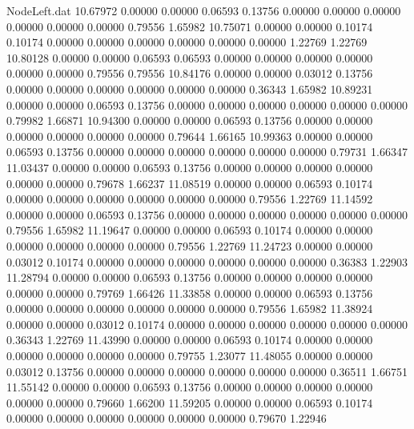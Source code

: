 \begin{filecontents}{NodeLeft.dat}
  10.67972    0.00000    0.00000     0.06593    0.13756    0.00000    0.00000    0.00000    0.00000    0.00000    0.00000    0.79556    1.65982
  10.75071    0.00000    0.00000     0.10174    0.10174    0.00000    0.00000    0.00000    0.00000    0.00000    0.00000    1.22769    1.22769
  10.80128    0.00000    0.00000     0.06593    0.06593    0.00000    0.00000    0.00000    0.00000    0.00000    0.00000    0.79556    0.79556
  10.84176    0.00000    0.00000     0.03012    0.13756    0.00000    0.00000    0.00000    0.00000    0.00000    0.00000    0.36343    1.65982
  10.89231    0.00000    0.00000     0.06593    0.13756    0.00000    0.00000    0.00000    0.00000    0.00000    0.00000    0.79982    1.66871
  10.94300    0.00000    0.00000     0.06593    0.13756    0.00000    0.00000    0.00000    0.00000    0.00000    0.00000    0.79644    1.66165
  10.99363    0.00000    0.00000     0.06593    0.13756    0.00000    0.00000    0.00000    0.00000    0.00000    0.00000    0.79731    1.66347
  11.03437    0.00000    0.00000     0.06593    0.13756    0.00000    0.00000    0.00000    0.00000    0.00000    0.00000    0.79678    1.66237
  11.08519    0.00000    0.00000     0.06593    0.10174    0.00000    0.00000    0.00000    0.00000    0.00000    0.00000    0.79556    1.22769
  11.14592    0.00000    0.00000     0.06593    0.13756    0.00000    0.00000    0.00000    0.00000    0.00000    0.00000    0.79556    1.65982
  11.19647    0.00000    0.00000     0.06593    0.10174    0.00000    0.00000    0.00000    0.00000    0.00000    0.00000    0.79556    1.22769
  11.24723    0.00000    0.00000     0.03012    0.10174    0.00000    0.00000    0.00000    0.00000    0.00000    0.00000    0.36383    1.22903
  11.28794    0.00000    0.00000     0.06593    0.13756    0.00000    0.00000    0.00000    0.00000    0.00000    0.00000    0.79769    1.66426
  11.33858    0.00000    0.00000     0.06593    0.13756    0.00000    0.00000    0.00000    0.00000    0.00000    0.00000    0.79556    1.65982
  11.38924    0.00000    0.00000     0.03012    0.10174    0.00000    0.00000    0.00000    0.00000    0.00000    0.00000    0.36343    1.22769
  11.43990    0.00000    0.00000     0.06593    0.10174    0.00000    0.00000    0.00000    0.00000    0.00000    0.00000    0.79755    1.23077
  11.48055    0.00000    0.00000     0.03012    0.13756    0.00000    0.00000    0.00000    0.00000    0.00000    0.00000    0.36511    1.66751
  11.55142    0.00000    0.00000     0.06593    0.13756    0.00000    0.00000    0.00000    0.00000    0.00000    0.00000    0.79660    1.66200
  11.59205    0.00000    0.00000     0.06593    0.10174    0.00000    0.00000    0.00000    0.00000    0.00000    0.00000    0.79670    1.22946

\end{filecontents}
